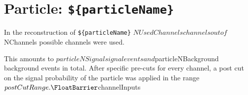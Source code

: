 \FloatBarrier
\clearpage
\cprotect\section{Particle: \verb|${particleName}|}
In the reconstruction of \verb|${particleName}| ${NUsedChannels} channels out of ${NChannels} possible channels were used.
This amounts to ${particleNSignal} signal events and ${particleNBackground} background events in total.
After specific pre-cuts for every channel, a post cut on the signal probability of the particle was applied in the range ${postCutRange}.
\FloatBarrier
${channelInputs}
\FloatBarrier
